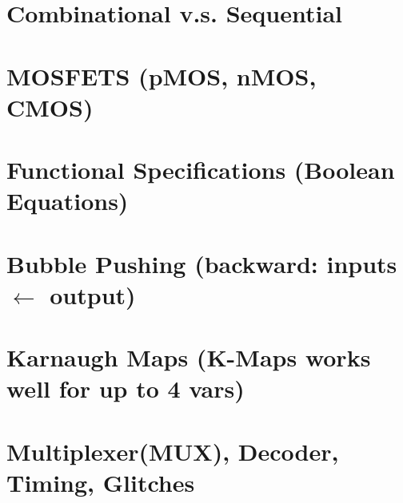 \documentclass[8pt,a4paper,landscape]{extarticle}
\begin{document}
\pagestyle{empty}
\setlength{\abovedisplayskip}{1pt}
\setlength{\belowdisplayskip}{1pt}
\setlength{\abovedisplayshortskip}{0pt}
\setlength{\belowdisplayshortskip}{0pt}

\begin{multicols*}{3}

% 


\section*{Combinational v.s. Sequential}


\section*{MOSFETS (pMOS, nMOS, CMOS)}


\section*{Functional Specifications (Boolean Equations)}


\section*{Bubble Pushing (backward: inputs $\leftarrow$ output)}


\section*{Karnaugh Maps (K-Maps works well for up to 4 vars)}


\section*{Multiplexer(MUX), Decoder, Timing, Glitches}


\vspace{1cm}



\pagebreak


\end{multicols*}
\end{document}
